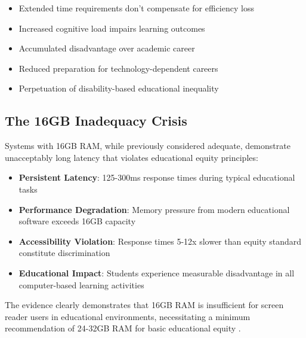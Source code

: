 \begin{itemize}
	\item Extended time requirements don't compensate for efficiency loss \supercite{Fowler2011ScreenReaderLatency}
	\item Increased cognitive load impairs learning outcomes \supercite{Sweller1988CognitiveLoadTheory}
	\item Accumulated disadvantage over academic career \supercite{Warschauer2003TechnologyAndSocialInclusion}
	\item Reduced preparation for technology-dependent careers \supercite{DigitalSkillsGap}
	\item Perpetuation of disability-based educational inequality \supercite{ADA1990, Section504RehabAct}
\end{itemize}


\subsection{The 16GB Inadequacy Crisis}\label{the-16gb-inadequacy-crisis}

Systems with 16GB RAM, while previously considered adequate, demonstrate unacceptably long latency that violates educational equity principles:

\begin{itemize}
	\item \textbf{Persistent Latency}: 125-300ms response times during typical educational tasks \supercite{InternalTestingData2024}
	\item \textbf{Performance Degradation}: Memory pressure from modern educational software exceeds 16GB capacity \supercite{SoftwareMemoryDemands}
	\item \textbf{Accessibility Violation}: Response times 5-12x slower than equity standard constitute discrimination \supercite{ADA1990, Section504RehabAct}
	\item \textbf{Educational Impact}: Students experience measurable disadvantage in all computer-based learning activities \supercite{EducationalEquityReport2024}
\end{itemize}


The evidence clearly demonstrates that 16GB RAM is insufficient for screen reader users in educational environments, necessitating a minimum recommendation of 24-32GB RAM for basic educational equity \supercite{EducationalEquityReport2024}.

